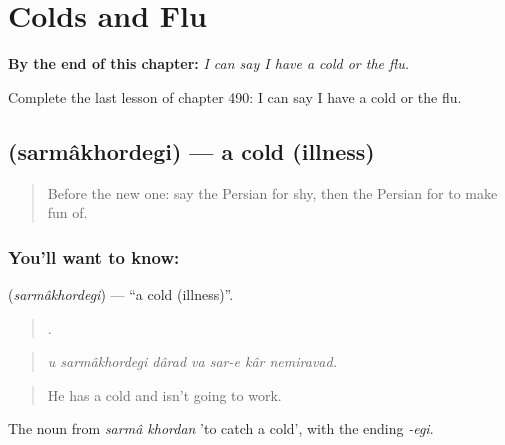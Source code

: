 
\chapter{Colds and Flu}
\label{ch:fa-colds-and-flu}

\begin{chapteropening}
\textbf{By the end of this chapter:} \emph{I can say I have a cold or the flu.}

Complete the last lesson of chapter 490: I can say I have a cold or the flu.
\end{chapteropening}

\section[\texorpdfstring{\fa{سرماخوردگی} (sarmâkhordegi)}{سرماخوردگی (sarmâkhordegi)}]{ (sarmâkhordegi) — a cold (illness)}

\label{lesson:FA-C490-sarmakhordegi}



\begin{quote}
Before the new one: say the Persian for shy, then the Persian for to make fun of.
\end{quote}

\subsection*{You'll want to know: }
\textbf{} (\emph{sarmâkhordegi}) — \textquotedblleft{}a cold (illness)\textquotedblright{}.

\begin{quote}
      .
\end{quote}

\begin{quote}
\emph{u sarmâkhordegi dârad va sar-e kâr nemiravad.}
\end{quote}

\begin{quote}
He has a cold and isn't going to work.
\end{quote}

The noun from \emph{sarmâ khordan} 'to catch a cold', with the ending \emph{-egi}.

